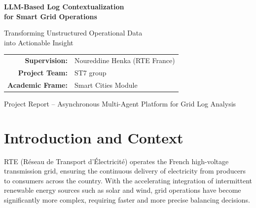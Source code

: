 \documentclass[11pt,a4paper]{article}
\begin{document}
\begin{titlepage}
\centering
\vspace*{1.5cm}

{\Huge\bfseries\color{rteblue} LLM-Based Log Contextualization\\[0.3em] for Smart Grid Operations\par}

\vspace{0.8cm}
{\Large\color{rtegray} Transforming Unstructured Operational Data\\into Actionable Insight\par}

\vspace{1.5cm}


\vspace{1.5cm}

\begin{tabular}{rl}
  \textbf{Supervision:} & Noureddine Henka (RTE France) \\
  \textbf{Project Team:} & ST7 group \\
  \textbf{Academic Frame:} & Smart Cities Module \\
\end{tabular}

\vfill

{\small\color{rtegray} Project Report -- Asynchronous Multi-Agent Platform for Grid Log Analysis}
\end{titlepage}


\section{Introduction and Context}

RTE (Réseau de Transport d'Électricité) operates the French high-voltage transmission grid, ensuring the continuous delivery of electricity from producers to consumers across the country. With the accelerating integration of intermittent renewable energy sources such as solar and wind, grid operations have become significantly more complex, requiring faster and more precise balancing decisions.
\end{document}
